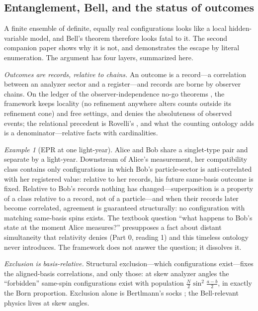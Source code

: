 \documentclass[11pt]{article}
\theoremstyle{definition}
\theoremstyle{remark}
\newtheorem*{example*}{Example}
\begin{document}
\subsection{Entanglement, Bell, and the status of outcomes}\label{sec:bell}
A finite ensemble of definite, equally real configurations looks like a local hidden-variable model, and Bell's theorem \cite{Bell1964,CHSH1969} therefore looks fatal to it. The second companion paper \cite{TillittCHSH} shows why it is not, and demonstrates the escape by literal enumeration. The argument has four layers, summarized here.

\emph{Outcomes are records, relative to chains.} An outcome is a record---a correlation between an analyzer sector and a register---and records are borne by observer chains. On the ledger of the observer-independence no-go theorems \cite{Brukner2018,FrauchigerRenner2018,Bong2020}, the framework keeps locality (no refinement anywhere alters counts outside its refinement cone) and free settings, and denies the absoluteness of observed events; the relational precedent is Rovelli's \cite{Rovelli1996,DiBiagio2021}, and what the counting ontology adds is a denominator---relative facts with cardinalities.

\begin{example*}[EPR at one light-year]
Alice and Bob share a singlet-type pair and separate by a light-year. Downstream of Alice's measurement, her compatibility class contains only configurations in which Bob's particle-sector is anti-correlated with her registered value: relative to her records, his future same-basis outcome is fixed. Relative to Bob's records nothing has changed---superposition is a property of a class relative to a record, not of a particle---and when their records later become correlated, agreement is guaranteed structurally: no configuration with matching same-basis spins exists. The textbook question ``what happens to Bob's state at the moment Alice measures?'' presupposes a fact about distant simultaneity that relativity denies (Part 0, reading 1) and this timeless ontology never introduces. The framework does not answer the question; it dissolves it.
\end{example*}

\emph{Exclusion is basis-relative.} Structural exclusion---which configurations exist---fixes the aligned-basis correlations, and only those: at skew analyzer angles the ``forbidden'' same-spin configurations exist with population $\frac{N}{2}\sin^2\frac{a-b}{2}$, in exactly the Born proportion. Exclusion alone is Bertlmann's socks \cite{Bell1981}; the Bell-relevant physics lives at skew angles.
\end{document}
